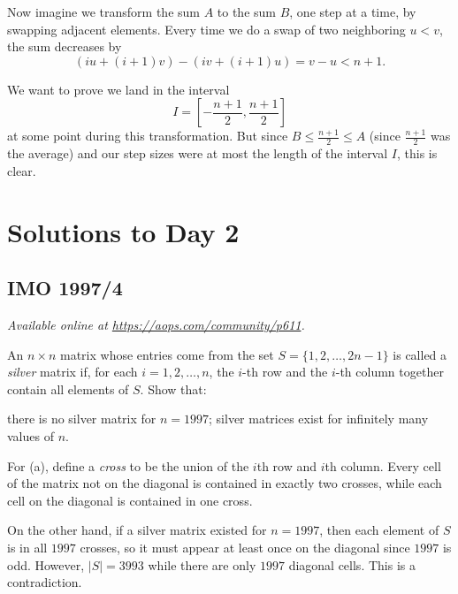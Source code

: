 \documentclass[11pt]{scrartcl}
\begin{document}
Now imagine we transform the sum $A$ to the sum $B$,
one step at a time, by swapping adjacent elements.
Every time we do a swap of two neighboring $u < v$, the sum decreases by
\[ (iu + (i+1)v) - (iv + (i+1)u) = v-u < n+1. \]

We want to prove we land in the interval
\[ I = \left[ -\frac{n+1}{2}, \frac{n+1}{2} \right] \]
at some point during this transformation.
But since $B \le \frac{n+1}{2} \le A$ (since $\frac{n+1}{2}$ was the average)
and our step sizes were at most the length of the interval $I$,
this is clear.
\pagebreak

\section{Solutions to Day 2}
\subsection{IMO 1997/4}
\textsl{Available online at \url{https://aops.com/community/p611}.}
\begin{mdframed}[style=mdpurplebox,frametitle={Problem statement}]
An $n \times n$ matrix whose entries come
from the set $S = \{1, 2, \dots , 2n - 1\}$
is called a \emph{silver} matrix if,
for each $i = 1, 2, \dots , n$,
the $i$-th row and the $i$-th column together
contain all elements of $S$. Show that:
\begin{enumerate}[(a)]
\ii there is no silver matrix for $n = 1997$;
\ii silver matrices exist for infinitely many values of $n$.
\end{enumerate}
\end{mdframed}
For (a), define a \emph{cross} to be the union
of the $i$th row and $i$th column.
Every cell of the matrix not on the diagonal is
contained in exactly two crosses,
while each cell on the diagonal is contained in one cross.

On the other hand, if a silver matrix existed for $n=1997$,
then each element of $S$ is in all $1997$ crosses,
so it must appear at least once on the diagonal since $1997$ is odd.
However, $|S| = 3993$ while there are only $1997$ diagonal cells.
This is a contradiction.
\end{document}
